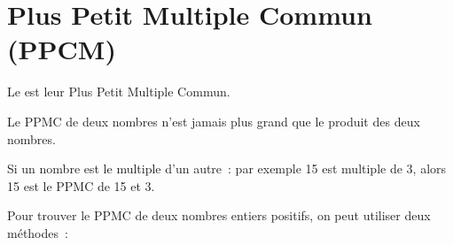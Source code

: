  
 \newpage
 
 \section{Plus Petit Multiple Commun (PPCM)}
 
\begin{definition}
Le  est leur Plus Petit Multiple Commun.
\end{definition}

 \begin{remarque}
Le PPMC de deux nombres n'est jamais plus grand que le produit des deux nombres.

Si un nombre est le multiple d'un autre : par exemple 15 est multiple de 3, alors 15 est le PPMC de 15 et 3.
 \end{remarque}
 
 \vspace{2em}
 
 Pour trouver le PPMC de deux nombres entiers positifs, on peut utiliser deux méthodes :  \\[1em]



